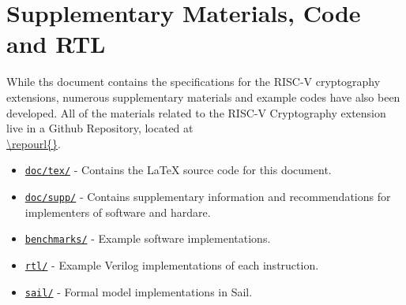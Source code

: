 
%
%

\newpage
\section{Supplementary Materials, Code and RTL}

While ths document contains the specifications for the RISC-V cryptography
extensions, numerous supplementary materials and example codes have
also been developed.
All of the materials related to the RISC-V Cryptography
extension live in a Github Repository, located at\\
\url{\repourl{}}.

\begin{itemize}
\item\href{\repourl{tree/master/doc}}{\tt doc/tex/}
- Contains the \LaTeX\xspace source code for this document.

\item\href{\repourl{tree/master/doc/supp/supplementary-info.adoc}}{\tt doc/supp/}
- Contains supplementary information and recommendations for implementers of
software and hardare.

\item\href{\repourl{tree/master/benchmarks}}{\tt benchmarks/}
- Example software implementations.

\item\href{\repourl{tree/master/rtl}}{\tt rtl/}
- Example Verilog implementations of each instruction.

\item\href{\repourl{tree/dev/next-release/sail}}{\tt sail/}
- Formal model implementations in Sail.
\end{itemize}

